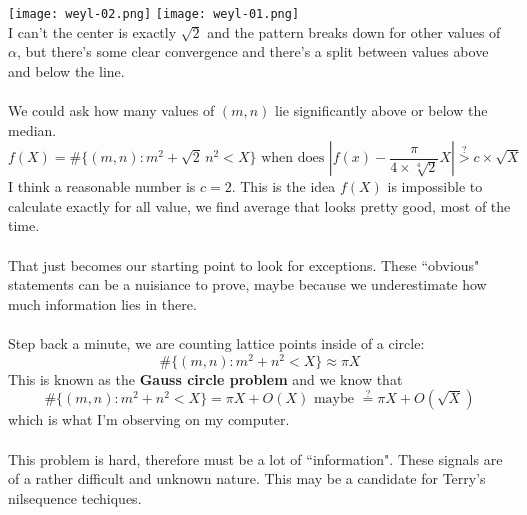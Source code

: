 \documentclass[12pt]{article}
\begin{document}
\newpage 

\texttt{[image: weyl-02.png]}
\texttt{[image: weyl-01.png]} \\

\noindent I can't the center is exactly $\sqrt{2}$ and the pattern breaks down for other values of $\alpha$, but there's some clear convergence and there's a split between values above and below the line.   \\ \\
We could ask how many values of $(m,n)$ lie significantly above or below the median. 
$$ f(X) =  \# \{ (m, n) : m^2 + \sqrt{2} \, n^2 < X \} \text{ when does }
\left|f(x) -   \frac{\pi}{4 \times \sqrt[4]{2} } X \right| \stackrel{?}{>} c \times \sqrt{X} $$
I think a reasonable number is $c = 2$.  This is the idea $f(X)$ is impossible to calculate exactly for all value, we find average that looks pretty good, most of the time. \\ \\
That just becomes our starting point to look for exceptions.  These ``obvious" statements can be a nuisiance to prove, maybe because we underestimate how much information lies in there. \\ \\
Step back a minute, we are counting lattice points inside of a circle:
$$ \# \{ (m,n):  m^2 + n^2 < X \} \approx \pi X $$
This is known as the \textbf{Gauss circle problem} and we know that 
$$ \# \{ (m,n):  m^2 + n^2 < X \}  =  \pi X  + O(X) \text{ maybe } \stackrel{?}{=}\pi X + O(\sqrt{X})$$
which is what I'm observing on my computer. \\ \\
This problem is hard, therefore must be a lot of ``information".  These signals are of a rather difficult and unknown nature.  This may be a candidate for Terry's nilsequence techiques.

\vfill
\end{document}
